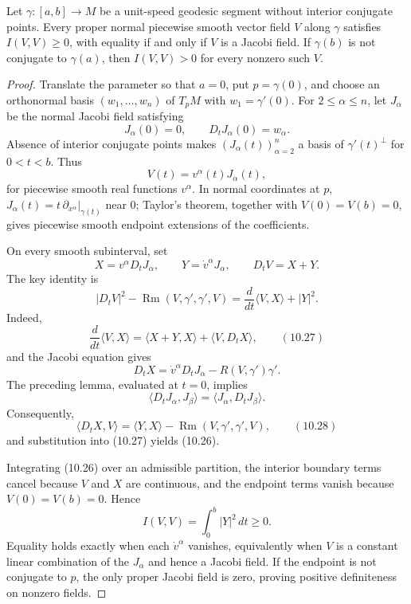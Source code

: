 \begin{theorem}
\label{thm:geodesic-without-conjugate-points}
Let $\gamma\colon[a,b]\to M$ be a unit-speed geodesic segment without
interior conjugate points. Every proper normal piecewise smooth vector field
$V$ along $\gamma$ satisfies $I(V,V)\geq0$, with equality if and only if $V$
is a Jacobi field. If $\gamma(b)$ is not conjugate to $\gamma(a)$, then
$I(V,V)>0$ for every nonzero such $V$.
\end{theorem}

\begin{proof}
\sketch Translate the parameter so that $a=0$, put $p=\gamma(0)$, and choose
an orthonormal basis $(w_1,\ldots,w_n)$ of $T_pM$ with
$w_1=\gamma'(0)$. For $2\leq\alpha\leq n$, let $J_\alpha$ be the normal
Jacobi field satisfying
\[
J_\alpha(0)=0,
\qquad D_tJ_\alpha(0)=w_\alpha.
\]
Absence of interior conjugate points makes $(J_\alpha(t))_{\alpha=2}^n$ a
basis of $\gamma'(t)^\perp$ for $0<t<b$. Thus
\begin{equation}
V(t)=v^\alpha(t)J_\alpha(t), \tag{10.25}
\end{equation}
for piecewise smooth real functions $v^\alpha$. In normal coordinates at $p$,
$J_\alpha(t)=t\,\partial_{x^\alpha}|_{\gamma(t)}$ near $0$; Taylor's theorem,
together with $V(0)=V(b)=0$, gives piecewise smooth endpoint extensions of
the coefficients.

On every smooth subinterval, set
\[
X=v^\alpha D_tJ_\alpha,
\qquad
Y=\dot v^\alpha J_\alpha,
\qquad D_tV=X+Y.
\]
The key identity is
\begin{equation}
|D_tV|^2-\operatorname{Rm}(V,\gamma',\gamma',V)
=\frac d{dt}\langle V,X\rangle+|Y|^2. \tag{10.26}
\end{equation}
Indeed,
\[
\frac d{dt}\langle V,X\rangle
=\langle X+Y,X\rangle+\langle V,D_tX\rangle,
\qquad (10.27)
\]
and the Jacobi equation gives
\[
D_tX=\dot v^\alpha D_tJ_\alpha-R(V,\gamma')\gamma'.
\]
The preceding lemma, evaluated at $t=0$, implies
\[
\langle D_tJ_\alpha,J_\beta\rangle
=\langle J_\alpha,D_tJ_\beta\rangle.
\]
Consequently,
\[
\langle D_tX,V\rangle
=\langle Y,X\rangle-\operatorname{Rm}(V,\gamma',\gamma',V),
\qquad (10.28)
\]
and substitution into (10.27) yields (10.26).

Integrating (10.26) over an admissible partition, the interior boundary terms
cancel because $V$ and $X$ are continuous, and the endpoint terms vanish
because $V(0)=V(b)=0$. Hence
\[
I(V,V)=\int_0^b|Y|^2\,dt\geq0.
\]
Equality holds exactly when each $\dot v^\alpha$ vanishes, equivalently when
$V$ is a constant linear combination of the $J_\alpha$ and hence a Jacobi
field. If the endpoint is not conjugate to $p$, the only proper Jacobi field is
zero, proving positive definiteness on nonzero fields.
\end{proof}

